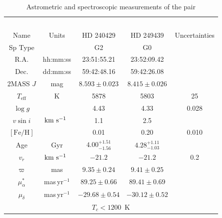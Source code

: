 \documentclass[12pt,letterpaper,margin=1in]{article}
\newcommand*\elem[1]{\ensuremath{\mathrm{#1}}}
\newcommand{\sunanalog}{\text{Krios}}
\newcommand{\bizarreone}{\text{Kronos}}
\newcommand{\kms}{\ensuremath{\rm km~s^{-1}}}
\begin{document}
\begin{table}[htpb]
  \centering
  \begin{threeparttable}
  \caption{Astrometric and spectroscopic measurements of the pair\label{tab:t1}}
\begin{tabular}{ccccc}
\hline\hline
                        &                & \sunanalog\            & \bizarreone\           &               \\
Name                    & Units          & HD 240429              & HD 249439              & Uncertainties \\
\hline
Sp Type                 &                & G2                     & G0                     &               \\
R.A.\tnote{a}           & hh:mm:ss       & 23:51:55.21            & 23:52:09.42            &               \\
Dec.\tnote{a}           & dd:mm:ss       & 59:42:48.16            & 59:42:26.08            &               \\
2MASS $J$\tnote{a}      & mag            & $8.593 \pm 0.023$      & $8.415 \pm 0.026$      &               \\
$T_\mathrm{eff}$        & K              & 5878                   & 5803                   & 25            \\
$\log{g}$               &                & 4.43                   & 4.33                   & 0.028         \\
$v\sin{i}$              & \kms\          & 1.1                    & 2.5                    &               \\
$[\elem{Fe}/\elem{H}]$  &                & 0.01                   & 0.20                   & 0.010         \\
Age\tnote{b}            & Gyr            & $4.00_{-1.56}^{+1.51}$ & $4.28_{-1.03}^{+1.11}$ &               \\
$v_r$                   & \kms\          & $-21.2$                & $-21.2$                & 0.2           \\
$\varpi$\tnote{a}       & mas            & $9.35 \pm 0.24$        & $9.41 \pm 0.25$        &               \\
$\mu_\alpha^*$\tnote{a} & mas\,yr$^{-1}$ & $89.25 \pm 0.66$       & $89.41 \pm 0.69$       &               \\
$\mu_\delta$\tnote{a}   & mas\,yr$^{-1}$ & $-29.68 \pm 0.54$      & $-30.12 \pm 0.52$      &               \\
\hline 
\multicolumn{5}{c}{$T_c < 1200$~K} \\

\end{tabular}
\end{threeparttable}
\end{table}
\end{document}
